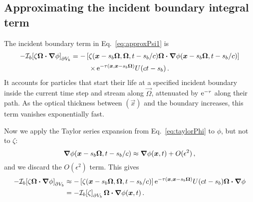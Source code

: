 \subsection{Approximating the incident boundary integral term}
\label{sec:adIncident}
The incident boundary term in Eq.~\eqref{eq:approxPsi1} is
\begin{multline*}
-\mathcal{I}_{b}\!\left[\zeta \bm{\Omega}\bm{\cdot} \bm{\nabla} \phi\right]_{\partial V_b}
  = -\left[\zeta(\bm{x} - s_b\bm{\Omega}, \bm{\Omega}, t - s_b/c)
   \bm{\Omega}\bm{\cdot} \bm{\nabla} \phi(\bm{x} - s_b\bm{\Omega}, t - s_b/c) \right]
   \\
\times
    \mathop{}\!\mathrm{e}^{ -\tau(\bm{x}, \bm{x} - s_b \bm{\Omega})}
    U(ct - s_b) \,.
\end{multline*}
It accounts for particles that start their life at a specified incident boundary
inside the current time step and stream along $\vec{\Omega}$, attenuated by
$\mathop{}\!\mathrm{e}^{-\tau}$ along their path. As the optical thickness between
$(\vec{x})$ and the boundary increases, this term vanishes
exponentially fast.

Now we apply the Taylor series expansion from Eq.~\eqref{eq:taylorPhi} to
$\phi$, but not to $\zeta$:
\begin{equation*}
  \bm{\nabla} \phi(\bm{x} - s_b\bm{\Omega}, t - s_b/c)
  \approx \bm{\nabla} \phi(\bm{x}, t) + O(\epsilon^2)\,,
\end{equation*}
and we discard the $O(\epsilon^2)$ term. This gives
\begin{align} \nonumber
-\mathcal{I}_{b}\!\left[\zeta \bm{\Omega}\bm{\cdot} \bm{\nabla} \phi\right]_{\partial V_b}
&\approx -\left[\zeta(\bm{x} - s_b\bm{\Omega}, \bm{\Omega}, t - s_b/c) \right]
  \mathop{}\!\mathrm{e}^{ -\tau(\bm{x}, \bm{x} - s_b \bm{\Omega})} U(ct - s_b)
  \bm{\Omega}\bm{\cdot} \bm{\nabla} \phi
 \\ \label{eq:bndyApprox}
&= -\mathcal{I}_{b}\!\left[\zeta\right]_{\partial V_b} \bm{\Omega}\bm{\cdot} \bm{\nabla} \phi(\bm{x}, t) \,.
\end{align}


